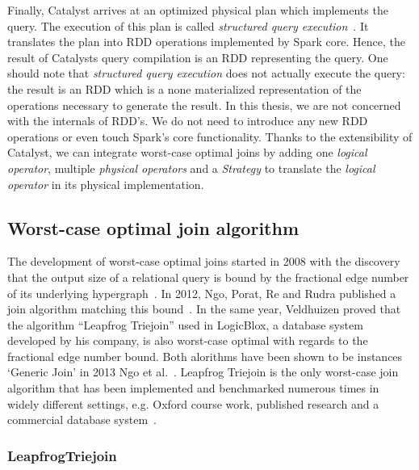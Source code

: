 Finally, Catalyst arrives at an optimized physical plan which implements the query.
The execution of this plan is called
\textit{structured query execution}~\cite{spark-internals-structured-query-execution}.
It translates the plan into RDD operations implemented by Spark core.
Hence, the result of Catalysts query compilation is an RDD representing the query.
One should note that \textit{structured query execution} does not actually execute the query: the result is an RDD which is a none
materialized representation of the operations necessary to generate the result.
In this thesis, we are not concerned with the internals of RDD's.
We do not need to introduce any new RDD operations or even touch Spark's core functionality.
Thanks to the extensibility of Catalyst, we can integrate worst-case optimal joins by adding one \textit{logical operator}, multiple
\textit{physical operators} and a \textit{Strategy} to translate the \textit{logical operator} in
its physical implementation.

\subsection{Worst-case optimal join algorithm}\label{subsec:worst-case-optimal-join-algorithm}
The development of worst-case optimal joins started in 2008 with the discovery that the output size of a relational query is bound by the fractional edge number of its underlying hypergraph~\cite{agm}.
In 2012, Ngo, Porat, Re and Rudra published a join algorithm matching this bound~\cite{nprr}.
In the same year, Veldhuizen proved that the algorithm ``Leapfrog Triejoin'' used in LogicBlox, a database system developed by his company, is also worst-case optimal with regards to the
fractional edge number bound.
Both alorithms have been shown to be instances `Generic Join' in 2013 Ngo et al.~\cite{skew-strikes-back}.
Leapfrog Triejoin is the only worst-case join algorithm that has been implemented and benchmarked numerous times in widely different settings, e.g. Oxford course work, published research and a commercial database system~\cite{leapfrog,andreas,olddog,myria,ammar2018distributed,leapfrog-triejoin-schroeder}.

\subsubsection{LeapfrogTriejoin}


